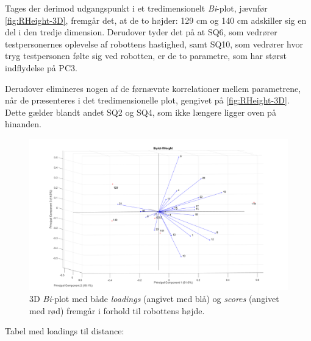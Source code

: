 Tages der derimod udgangspunkt i et tredimensionelt \textit{Bi}-plot, jævnfør \autoref{fig:RHeight-3D}, fremgår det, at de to højder: 129 cm og 140 cm adskiller sig en del i den tredje dimension. Derudover tyder det på at SQ6, som vedrører testpersonernes oplevelse af robottens hastighed, samt SQ10, som vedrører hvor tryg testpersonen følte sig ved robotten, er de to parametre, som har størst indflydelse på PC3. 

Derudover elimineres nogen af de førnævnte korrelationer mellem parametrene, når de præsenteres i det tredimensionelle plot, gengivet på \autoref{fig:RHeight-3D}. Dette gælder blandt andet SQ2 og SQ4, som ikke længere ligger oven på hinanden.   
%
\begin{figure}[H]
\centering
\includegraphics[width=\textwidth]{Figure/DatabehandlingSkalaer/PCAfigures/RHeight-3D.png}
\caption{3D \textit{Bi}-plot med både \textit{loadings} (angivet med blå) og \textit{scores} (angivet med rød) fremgår i forhold til robottens højde.}
\label{fig:RHeight-3D}
\end{figure}
%




Tabel med loadings til distance:

